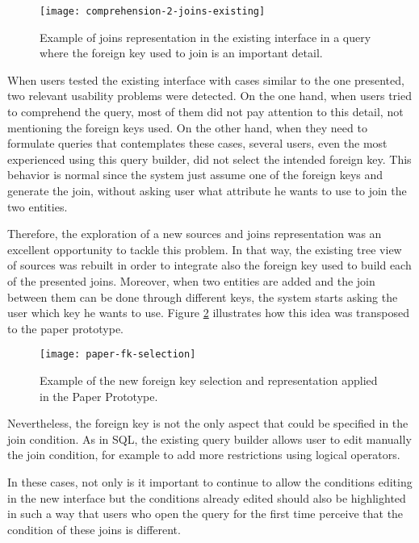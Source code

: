 \begin{figure}[htbp]
	\centering
	\texttt{[image: comprehension-2-joins-existing]}
	\caption{Example of joins representation in the existing interface in a query where the foreign key used to join is an important detail.}
	\label{fig:comprehension2JoinsExisting}
\end{figure}

When users tested the existing interface with cases similar to the one presented, two relevant usability problems were detected. On the one hand, when users tried to comprehend the query, most of them did not pay attention to this detail, not mentioning the foreign keys used. On the other hand, when they need to formulate queries that contemplates these cases, several users, even the most experienced using this query builder, did not select the intended foreign key. This behavior is normal since the system just assume one of the foreign keys and generate the join, without asking user what attribute he wants to use to join the two entities.

Therefore, the exploration of a new sources and joins representation was an excellent opportunity to tackle this problem. In that way, the existing tree view of sources was rebuilt in order to integrate also the foreign key used to build each of the presented joins. Moreover, when two entities are added and the join between them can be done through different keys, the system starts asking the user which key he wants to use. Figure \ref{fig:paperFkSelect} illustrates how this idea was transposed to the paper prototype.

\begin{figure}[htbp]
	\centering
  \texttt{[image: paper-fk-selection]}
	\caption{Example of the new foreign key selection and representation applied in the Paper Prototype.}
	\label{fig:paperFkSelect}
\end{figure}

Nevertheless, the foreign key is not the only aspect that could be specified in the join condition. As in SQL, the existing query builder allows user to edit manually the join condition, for example to add more restrictions using logical operators.

In these cases, not only is it important to continue to allow the conditions editing in the new interface but the conditions already edited should also be highlighted in such a way that users who open the query for the first time perceive that the condition of these joins is different. 

